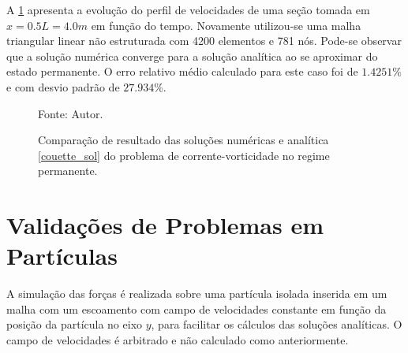 A \ref{couette_comp} apresenta a evolução do perfil de velocidades de uma seção tomada em $x=0.5L=4.0m$ em função do tempo.
Novamente utilizou-se uma malha triangular linear não estruturada com 4200 elementos e 781 nós.
Pode-se observar que a solução numérica converge para a solução analítica ao se aproximar do estado permanente.
O erro relativo médio calculado para este caso foi de $1.4251\%$ e com desvio padrão de $27.934\%$.
\begin{figure}[H]
    \centering
     {\raggedleft \scriptsize Fonte: Autor.}
    \caption{Comparação de resultado das soluções numéricas e analítica \ref{couette_sol} do problema de corrente-vorticidade no regime permanente.}
    \label{couette_comp}
\end{figure}



\section{\textbf{Validações de Problemas em Partículas}}
\label{sec_particulas}
A simulação das forças é realizada sobre uma partícula isolada inserida em um malha com um escoamento com campo de velocidades constante em função da posição da partícula no eixo $y$, para facilitar os cálculos das soluções analíticas.
O campo de velocidades é arbitrado e não calculado como anteriormente.

